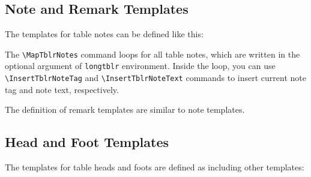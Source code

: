 \documentclass[oneside]{book}
\begin{document}
\subsection{Note and Remark Templates}

The templates for table notes can be defined like this:

\begin{codehigh}
\end{codehigh}
\begin{codehigh}
\end{codehigh}

The \verb!\MapTblrNotes! command loops for all table notes,
which are written in the optional argument of \verb!longtblr! environment.
Inside the loop, you can use \verb!\InsertTblrNoteTag! and \verb!\InsertTblrNoteText!
commands to insert current note tag and note text, respectively.

The definition of remark templates are similar to note templates.
\nopagebreak
\begin{codehigh}
\end{codehigh}
\begin{codehigh}
\end{codehigh}

\subsection{Head and Foot Templates}

The templates for table heads and foots are defined as including other templates:

\begin{codehigh}
\end{codehigh}
\end{document}
